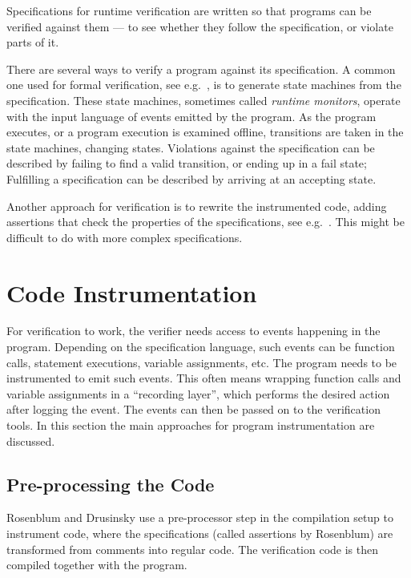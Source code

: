 Specifications for runtime verification are written so that programs can be
verified against them --- to see whether they follow the specification, or
violate parts of it.

There are several ways to verify a program against its specification. A common
one used for formal verification, see e.g.\ \cite{bauer06monitoring,
bodden05efficientrv, jalili07rverl, barringer03eagle}, is to generate state
machines from the specification. These state machines, sometimes called
\textit{runtime monitors}, operate with the input language of events emitted by
the program. As the program executes, or a program execution is examined
offline, transitions are taken in the state machines, changing states.
Violations against the specification can be described by failing to find a
valid transition, or ending up in a fail state; Fulfilling a specification can
be described by arriving at an accepting state.

Another approach for verification is to rewrite the instrumented code, adding
assertions that check the properties of the specifications, see e.g.\
\cite{rosenblum95practicalassertions, drusinsky00temporalrover}. This might be
difficult to do with more complex specifications.


\section{Code Instrumentation} \label{section-instrumentation}

For verification to work, the verifier needs access to events happening in the
program. Depending on the specification language, such events can be function
calls, statement executions, variable assignments, etc.  The program needs to be
instrumented to emit such events. This often means wrapping function calls and
variable assignments in a ``recording layer'', which performs the desired
action after logging the event. The events can then be passed on to the
verification tools. In this section the main approaches for program
instrumentation are discussed.


\subsection{Pre-processing the Code}

Rosenblum \cite{rosenblum95practicalassertions} and Drusinsky
\cite{drusinsky00temporalrover} use a pre-processor step in the compilation
setup to instrument code, where the specifications (called assertions by
Rosenblum) are transformed from comments into regular code. The verification
code is then compiled together with the program.

